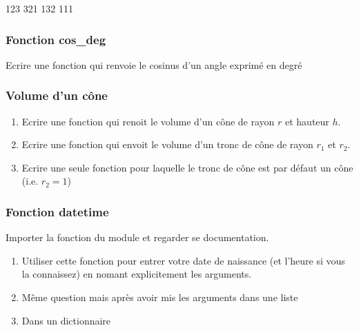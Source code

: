 \documentclass[letterpaper,10pt,english]{sphinxhowto}
\begin{document}
\begin{sphinxVerbatim}[commandchars=\\\{\}]
123
321
132
111
\end{sphinxVerbatim}


\subsubsection{Fonction cos\_deg}
\label{\detokenize{cours1_fonctions_exercices:fonction-cos-deg}}
\sphinxAtStartPar
Ecrire une fonction qui renvoie le cosinus d’un angle exprimé en degré


\subsubsection{Volume d’un cône}
\label{\detokenize{cours1_fonctions_exercices:volume-d-un-cone}}\begin{enumerate}
%
\item {} 
\sphinxAtStartPar
Ecrire une fonction qui renoit le volume d’un cône de rayon \(r\) et hauteur \(h\).

\item {} 
\sphinxAtStartPar
Ecrire une fonction qui envoit le volume d’un tronc de cône de rayon \(r_1\) et \(r_2\).

\item {} 
\sphinxAtStartPar
Ecrire une seule fonction pour laquelle le tronc de cône est par défaut un cône (i.e. \(r_2=1\))

\end{enumerate}


\subsubsection{Fonction datetime}
\label{\detokenize{cours1_fonctions_exercices:fonction-datetime}}
\sphinxAtStartPar
Importer la fonction  du module  et regarder se documentation.
\begin{enumerate}
%
\item {} 
\sphinxAtStartPar
Utiliser cette fonction pour entrer votre date de naissance (et l’heure si vous la connaissez) en nomant explicitement les arguments.

\item {} 
\sphinxAtStartPar
Même question mais après avoir mis les arguments dans une liste

\item {} 
\sphinxAtStartPar
Dans un dictionnaire

\end{enumerate}
\end{document}
